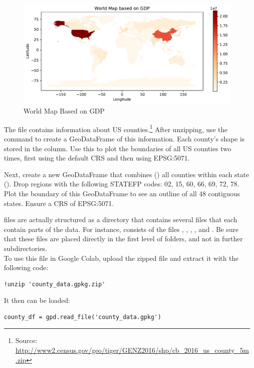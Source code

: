 \begin{figure}[H]
\begin{center}
\includegraphics[scale=.7]{figures/gdp.pdf}
\end{center}
\caption{World Map Based on GDP}
\label{figure:gdp_map}
\end{figure}


\begin{problem}
The file  contains information about US counties.\footnote{Source: \url{http://www2.census.gov/geo/tiger/GENZ2016/shp/cb_2016_us_county_5m.zip}}
After unzipping, use the command  to create a GeoDataFrame of this information.
Each county's shape is stored in the  column.
Use this to plot the boundaries of all US counties two times, first using the default CRS and then using EPSG:5071.

Next, create a new GeoDataFrame that combines () all counties within each state ().
Drop regions with the following STATEFP codes: 02, 15, 60, 66, 69, 72, 78.
Plot the boundary of this GeoDataFrame to see an outline of all 48 contiguous states.
Ensure a CRS of EPSG:5071.
\label{problem:us_counties}
\end{problem}

\begin{info}
 files are actually structured as a directory that contains several files that each contain parts of the data.
For instance,  consists of the files , , , , and .
Be sure that these files are placed directly in the first level of folders, and not in further subdirectories.\\
To use this file in Google Colab, upload the zipped file and extract it with the following code:
\begin{lstlisting}
!unzip 'county_data.gpkg.zip'
\end{lstlisting}
It then can be loaded:
\begin{lstlisting}
county_df = gpd.read_file('county_data.gpkg')
\end{lstlisting}
\end{info}

